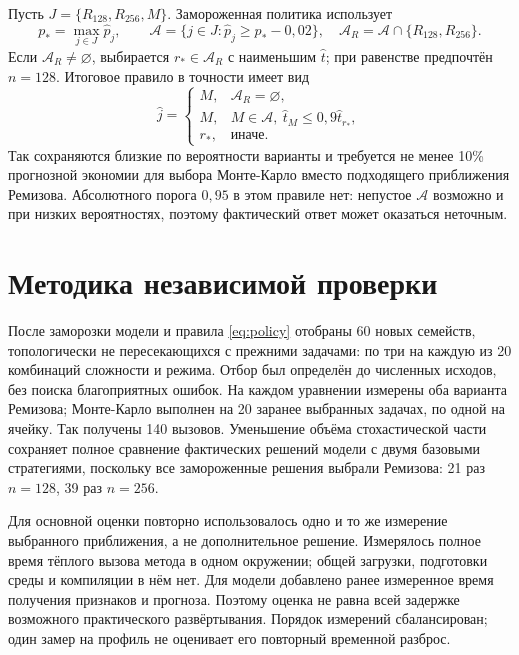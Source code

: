 Пусть $J=\{R_{128},R_{256},M\}$. Замороженная политика использует
\begin{equation}\label{eq:eligible}
p_* =\max_{j\in J}\widehat p_j,\qquad
\mathcal A=\{j\in J:\widehat p_j\ge p_*-0{,}02\},\quad
\mathcal A_R=\mathcal A\cap\{R_{128},R_{256}\}.
\end{equation}
Если $\mathcal A_R\ne\varnothing$, выбирается $r_*\in\mathcal A_R$ с наименьшим $\widehat t$; при равенстве предпочтён $n=128$. Итоговое правило в точности имеет вид
\begin{equation}\label{eq:policy}
\widehat j=\begin{cases}M,&\mathcal A_R=\varnothing,\\
M,&M\in\mathcal A,\ \widehat t_M\le0{,}9\widehat t_{r_*},\\
r_*,&\text{иначе}.\end{cases}
\end{equation}
Так сохраняются близкие по вероятности варианты и требуется не менее 10\% прогнозной экономии для выбора Монте-Карло вместо подходящего приближения Ремизова. Абсолютного порога $0{,}95$ в этом правиле нет: непустое $\mathcal A$ возможно и при низких вероятностях, поэтому фактический ответ может оказаться неточным.

\clearpage
\section{Методика независимой проверки}
После заморозки модели и правила \eqref{eq:policy} отобраны 60 новых семейств, топологически не пересекающихся с прежними задачами: по три на каждую из 20 комбинаций сложности и режима. Отбор был определён до численных исходов, без поиска благоприятных ошибок. На каждом уравнении измерены оба варианта Ремизова; Монте-Карло выполнен на 20 заранее выбранных задачах, по одной на ячейку. Так получены 140 вызовов. Уменьшение объёма стохастической части сохраняет полное сравнение фактических решений модели с двумя базовыми стратегиями, поскольку все замороженные решения выбрали Ремизова: 21 раз $n=128$, 39 раз $n=256$.

Для основной оценки повторно использовалось одно и то же измерение выбранного приближения, а не дополнительное решение. Измерялось полное время тёплого вызова метода в одном окружении; общей загрузки, подготовки среды и компиляции в нём нет. Для модели добавлено ранее измеренное время получения признаков и прогноза. Поэтому оценка не равна всей задержке возможного практического развёртывания. Порядок измерений сбалансирован; один замер на профиль не оценивает его повторный временной разброс.

